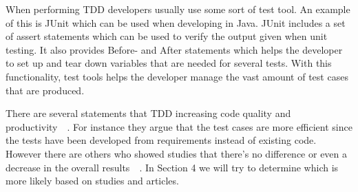 When performing TDD developers usually use some sort of test tool. An example of this is JUnit which can be used when developing in Java. JUnit includes a set of assert statements which can be used to verify the output given when unit testing. It also provides Before- and After statements which helps the developer to set up and tear down variables that are needed for several tests. With this functionality, test tools helps the developer manage the vast amount of test cases that are produced.


There are several statements that TDD increasing code quality and productivity~\cite{beckXP}~\cite{erdogmus}. For instance they argue that the test cases are more efficient since the tests have been developed from requirements instead of existing code. However there are others who showed studies that there’s no difference or even a decrease in the overall results~\cite{tddInvest}~\cite{mullerandhagner}. In Section 4 we will try to determine which is more likely based on studies and articles.